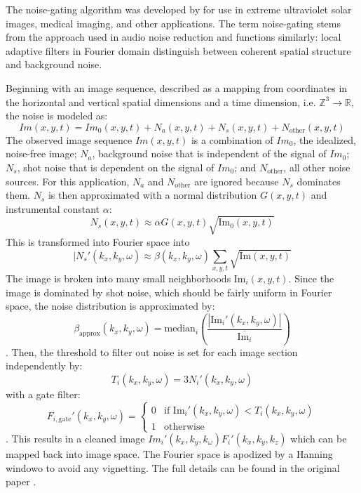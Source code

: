 \documentclass[twoside]{report}
\begin{document}
The noise-gating algorithm was developed by \cite{deforest:2017} for use in extreme ultraviolet solar images, medical imaging, and other applications. The term noise-gating stems from the approach used in audio noise reduction and functions similarly: local adaptive filters in Fourier domain distinguish between coherent spatial structure and background noise. 

Beginning with an image sequence, described as a mapping from coordinates in the horizontal and vertical spatial dimensions and a time dimension, i.e. $\mathbb{Z}^3 \rightarrow \mathbb{R}$, the noise is modeled as:
\[Im(x,y,t) = Im_0(x,y,t) + N_a(x,y,t) + N_s(x,y,t) + N_{\text{other}}(x,y,t) \]
The observed image sequence $Im(x,y,t)$ is a combination of $Im_0$, the idealized, noise-free image; $N_a$, background noise that is independent of the signal of $Im_0$; $N_s$, shot noise that is dependent on the signal of $Im_0$; and $N_{\text{other}}$, all other noise sources. For this application, $N_a$ and $N_{\text{other}}$ are ignored because $N_s$ dominates them.  $N_s$ is then approximated with a normal distribution $G(x,y,t)$ and instrumental constant $\alpha$:
\[N_s(x,y,t) \approx \alpha G(x,y,t) \sqrt{\text{Im}_0(x,y,t)} \]
This is transformed into Fourier space into
\[|N_s'(k_x, k_y, \omega) \approx \beta(k_x, k_y, \omega) \sum_{x,y,t}\sqrt{\text{Im}(x,y,t)}\]
The image is broken into many small neighborhoods $\text{Im}_i (x,y,t)$. Since the image is dominated by shot noise, which should be fairly uniform in Fourier space, the noise distribution is approximated by: \[\beta_{\text{approx}}(k_x,k_y,\omega) = \text{median}_i \left(\frac{|\text{Im}_i'(k_x,k_y,\omega)|}{\overline{\text{Im}_i}} \right)\]. Then, the threshold to filter out noise is set for each image section independently by:
\[T_i(k_x, k_y, \omega) = 3 N_i'(k_x, k_y, \omega)\] with a gate filter:
\[F_{i, \text{gate}}' (k_x, k_y, \omega) = \begin{cases} 0 & \text{if Im}_i'(k_x, k_y, \omega) < T_i(k_x, k_y, \omega) \\ 1 & \text{otherwise} \end{cases}\]. 
This results in a cleaned image $Im_i'(k_x, k_y, k_\omega) F_i'(k_x, k_y, k_z)$ which can be mapped back into image space. The Fourier space is apodized by a Hanning windowo to avoid any vignetting. The full details can be found in the original paper \cite{deforest:2017}. 
\end{document}
